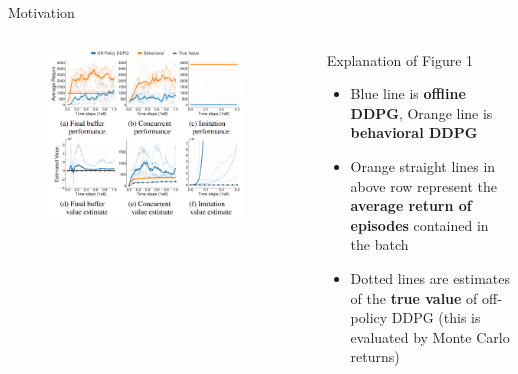 \documentclass[11pt]{beamer}
\newcommand{\tb}[1]{\textbf{#1}}
\begin{document}
\begin{frame}{Motivation}
    \begin{columns}
        \begin{column}{0.5\textwidth}
            \begin{figure}
                \centering
            \includegraphics[width=0.9\textwidth]{figure1.png}
            \end{figure}
        \end{column}
        \begin{column}{0.5\textwidth}
            \begin{block}{Explanation of Figure 1}
                \begin{itemize}
                    \item Blue line is \tb{offline DDPG}, Orange line is \tb{behavioral DDPG}
                    \item Orange straight lines in above row represent the \tb{average return of episodes} contained in the batch
                    \item Dotted lines are estimates of the \tb{true value} of off-policy DDPG (this is evaluated by Monte Carlo returns)
                \end{itemize}
            \end{block}
            

\end{column}
\end{columns}
\end{frame}
\end{document}
